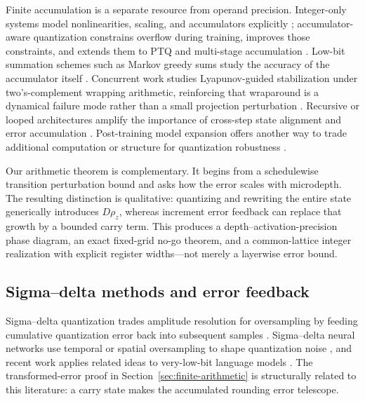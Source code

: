 \documentclass[twoside,11pt]{article}
\begin{document}
Finite accumulation is a separate resource from operand precision.  Integer-only systems model nonlinearities, scaling, and accumulators explicitly \citep{KimEtAl2021IBERT,YaoEtAl2021HAWQV3,HuEtAl2024ILLM}; accumulator-aware quantization constrains overflow during training, improves those constraints, and extends them to PTQ and multi-stage accumulation \citep{ColbertEtAl2023A2Q,ColbertEtAl2024A2QPlus,ColbertEtAl2024AXE}.  Low-bit summation schemes such as Markov greedy sums study the accuracy of the accumulator itself \citep{NateshKungKong2025MGS}.  Concurrent work studies Lyapunov-guided stabilization under two's-complement wrapping arithmetic, reinforcing that wraparound is a dynamical failure mode rather than a small projection perturbation \citep{HamadoucheHussain2026}.  Recursive or looped architectures amplify the importance of cross-step state alignment and error accumulation \citep{FangEtAl2026LoopQ}.  Post-training model expansion offers another way to trade additional computation or structure for quantization robustness \citep{FrancoEtAl2025Expansion}.

Our arithmetic theorem is complementary.  It begins from a schedulewise transition perturbation bound and asks how the error scales with microdepth.  The resulting distinction is qualitative: quantizing and rewriting the entire state generically introduces $D\rho_z$, whereas increment error feedback can replace that growth by a bounded carry term.  This produces a depth--activation-precision phase diagram, an exact fixed-grid no-go theorem, and a common-lattice integer realization with explicit register widths---not merely a layerwise error bound.

\subsection{Sigma--delta methods and error feedback}

Sigma--delta quantization trades amplitude resolution for oversampling by feeding cumulative quantization error back into subsequent samples \citep{DaubechiesDeVore2003,Gunturk2003,KrahmerSaabWard2012}.  Sigma--delta neural networks use temporal or spatial oversampling to shape quantization noise \citep{OConnorWelling2017}, and recent work applies related ideas to very-low-bit language models \citep{XiaEtAl2025SDQ}.  The transformed-error proof in Section~\ref{sec:finite-arithmetic} is structurally related to this literature: a carry state makes the accumulated rounding error telescope.
\end{document}

